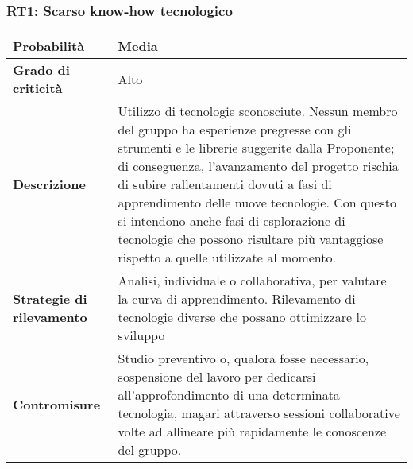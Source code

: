 \subsubsection{RT1: Scarso know-how tecnologico}

\bgroup
\begin{adjustwidth}{-0.5cm}{-0.5cm}
 	\begin{longtable}{P{4.5cm}|>{\justifying \arraybackslash}P{9cm}}

		\textbf{Probabilità} & Media \\
        \hline
        \textbf{Grado di criticità} & Alto \\
        \hline
        \textbf{Descrizione} & Utilizzo di tecnologie sconosciute. Nessun membro del gruppo ha
        esperienze pregresse con gli strumenti e le librerie suggerite dalla Proponente; di conseguenza, l’avanzamento del progetto rischia di subire rallentamenti dovuti a fasi di apprendimento delle nuove tecnologie.
        Con questo si intendono anche fasi di esplorazione di tecnologie che possono risultare più vantaggiose rispetto a quelle utilizzate al momento. \\
        \hline
        \textbf{Strategie di rilevamento} &  Analisi, individuale o collaborativa, per valutare la
        curva di apprendimento. Rilevamento di tecnologie diverse che possano ottimizzare lo sviluppo \\
        \hline
        \textbf{Contromisure} & Studio preventivo o, qualora fosse necessario, sospensione del
        lavoro per dedicarsi all’approfondimento di una determinata tecnologia, magari attraverso sessioni collaborative volte ad allineare più rapidamente le conoscenze del gruppo.  
	\end{longtable}
\end{adjustwidth}
\egroup